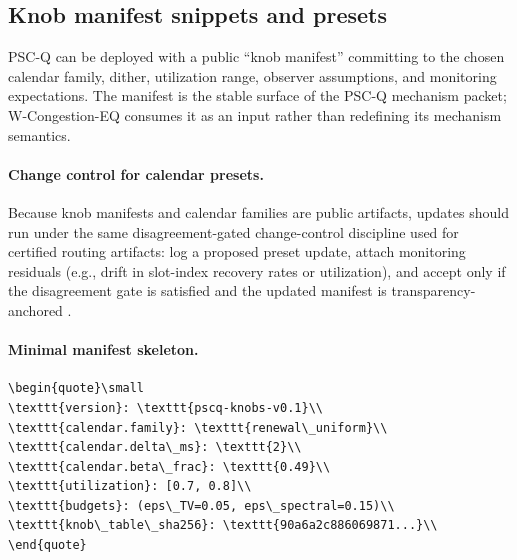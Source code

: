 \documentclass[11pt]{article}
\theoremstyle{definition}
\theoremstyle{remark}
\begin{document}
\subsection{Knob manifest snippets and presets}
PSC-Q can be deployed with a public ``knob manifest'' committing to the chosen calendar family, dither, utilization range, observer assumptions, and monitoring expectations.
The manifest is the stable surface of the PSC-Q mechanism packet; W-Congestion-EQ consumes it as an input rather than redefining its mechanism semantics.

\paragraph{Change control for calendar presets.}
Because knob manifests and calendar families are public artifacts, updates should run under the same disagreement-gated change-control discipline used for certified routing artifacts: log a proposed preset update, attach monitoring residuals (e.g., drift in slot-index recovery rates or utilization), and accept only if the disagreement gate is satisfied and the updated manifest is transparency-anchored \cite{series:recert,anondht_release_receipts}.

\paragraph{Minimal manifest skeleton.}
\begin{lstlisting}[basicstyle=\ttfamily\small]
\begin{quote}\small
\texttt{version}: \texttt{pscq-knobs-v0.1}\\
\texttt{calendar.family}: \texttt{renewal\_uniform}\\
\texttt{calendar.delta\_ms}: \texttt{2}\\
\texttt{calendar.beta\_frac}: \texttt{0.49}\\
\texttt{utilization}: [0.7, 0.8]\\
\texttt{budgets}: (eps\_TV=0.05, eps\_spectral=0.15)\\
\texttt{knob\_table\_sha256}: \texttt{90a6a2c886069871...}\\
\end{quote}
\end{lstlisting}
\end{document}
